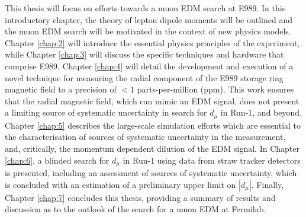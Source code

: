 This thesis will focus on efforts towards a muon EDM search at E989. In this introductory chapter, the theory of lepton dipole moments will be outlined and the muon EDM search will be motivated in the context of new physics models. Chapter \ref{chap:2} will introduce the essential physics principles of the experiment, while Chapter \ref{chap:3} will discuss the specific techniques and hardware that comprise E989. Chapter \ref{chap:4} will detail the development and execution of a novel technique for measuring the radial component of the E989 storage ring magnetic field to a precision of $<1$ parts-per-million (ppm). This work ensures that the radial magnetic field, which can mimic an EDM signal, does not present a limiting source of systematic uncertainty in search for $d_{\mu}$ in Run-1, and beyond. Chapter \ref{chap:5} describes the large-scale simulation efforts which are essential to the characterisation of sources of systematic uncertainty in the measurement, and, critically, the momentum dependent dilution of the EDM signal. In Chapter \ref{chap:6}, a blinded search for $d_{\mu}$ in Run-1 using data from straw tracker detectors is presented, including an assessment of sources of systematic uncertainty, which is concluded with an estimation of a preliminary upper limit on $|d_{\mu}|$. Finally, Chapter \ref{chap:7} concludes this thesis, providing a summary of results and discussion as to the outlook of the search for a muon EDM at Fermilab. 

